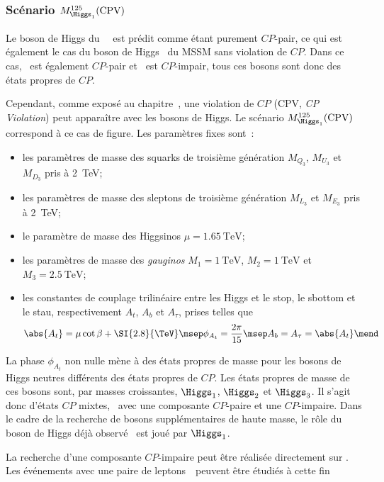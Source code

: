 \subsubsection{Scénario $M_{\Higgs_1}^{125}(\text{CPV})$}
Le boson de Higgs du \SM\ \higgsSM\ est prédit comme étant purement $CP$-pair,
ce qui est également le cas du boson de Higgs \higgsMSSM\ du MSSM sans violation de $CP$.
Dans ce cas, \Higgs\ est également $CP$-pair et \HiggsA\ est $CP$-impair,
tous ces bosons sont donc des états propres de $CP$.
\par
Cependant, comme exposé au chapitre~,
une violation de $CP$ (CPV, \emph{CP Violation}) peut apparaître avec les bosons de Higgs.
Le scénario $M_{\Higgs_1}^{125}(\text{CPV})$ correspond à ce cas de figure.
Les paramètres fixes sont~\cite{Bagnaschi_2019}:
\begin{itemize}
\item les paramètres de masse des squarks de troisième génération $M_{Q_3}$, $M_{U_3}$ et $M_{D_3}$ pris à \SI{2}{\TeV};
\item les paramètres de masse des sleptons de troisième génération $M_{L_3}$ et $M_{E_3}$ pris à \SI{2}{\TeV};
\item le paramètre de masse des Higgsinos $\mu=\SI{1.65}{\TeV}$;
\item les paramètres de masse des \emph{gauginos} $M_1=\SI{1}{\TeV}$, $M_2=\SI{1}{\TeV}$ et $M_3=\SI{2.5}{\TeV}$;
\item les constantes de couplage trilinéaire entre les Higgs et le stop, le sbottom et le stau, respectivement $A_t$, $A_b$ et $A_\tau$, prises telles que
\begin{equation}
\abs{A_t} = \mu\cot\beta+\SI{2.8}{\TeV}
\msep
\phi_{A_t} = \frac{2\pi}{15}
\msep
A_b = A_\tau = \abs{A_t}
\mend
\end{equation}
\end{itemize}
La phase $\phi_{A_t}$ non nulle mène à des états propres de masse
pour les bosons de Higgs neutres différents des états propres de $CP$.
Les états propres de masse de ces bosons sont, par masses croissantes,
$\Higgs_1$, $\Higgs_2$ et $\Higgs_3$.
Il s'agit donc d'états $CP$ mixtes,
\ie\ avec une composante $CP$-paire et une $CP$-impaire.
Dans le cadre de la recherche de bosons supplémentaires de haute masse,
le rôle du boson de Higgs déjà observé \higgs\ est joué par $\Higgs_1$.
\par
La recherche d'une composante $CP$-impaire peut être réalisée directement sur \higgs.
Les événements avec une paire de leptons~\tau\ peuvent être étudiés à cette fin~\cite{Bourgatte_thesis}
